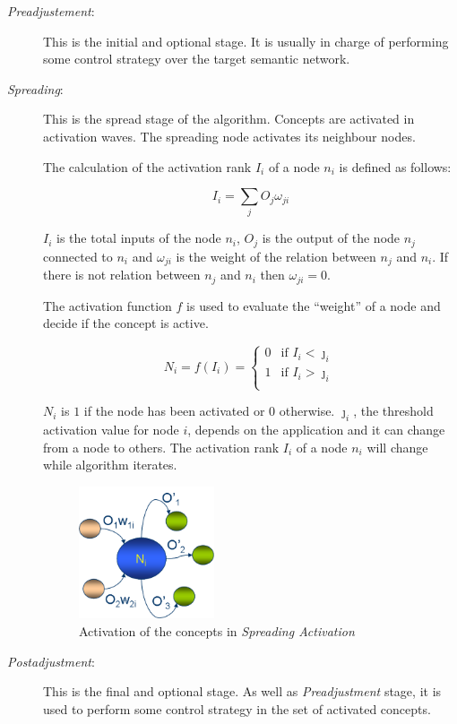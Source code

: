 \documentclass{llncs}
\begin{document}
\begin{description}
\item [\textit{Preadjustement}:] This is the initial and optional stage. It is usually in charge
of performing some control strategy over the target semantic network.
\medskip

\item [\textit{Spreading}:] This is the spread stage of the algorithm. Concepts
are activated in activation waves. The spreading node activates its neighbour
nodes.
\medskip

The calculation of the activation rank $I_i$ of a node $n_i$ is defined as
follows:

\begin{equation}
I_i  = \sum_j{O_j \omega_{ji}}
\end{equation}
\medskip

$I_i$ is the total inputs of the node $n_i$, $O_j$
is the output of the node $n_j$ connected to $n_i$ and $\omega_{ji}$
is the weight of the relation between $n_j$ and $n_i$. 
If there is not relation between $n_j$ and $n_i$ then
$\omega_{ji} = 0$. 


The activation function $f$ is used to evaluate the ``weight'' of a node and
decide if the concept is active.


\begin{equation}
N_i=f(I_i)=\begin{cases} 0 & \text{if $I_i < \jmath_i$} \\ 1 &
\text{if $I_i > \jmath_i$}
\\ \end{cases}
\end{equation}


$N_i$ is $1$ if the node has been activated or 0 otherwise. 
$\jmath_i$, the threshold activation value for node $i$, depends on the application
and it can change from a node to others. The activation rank $I_i$ of a
node $n_i$ will change while algorithm iterates.

\begin{figure}[h]
 \centering
 \includegraphics[width=4cm]{images/modelo-sa}
    \caption{Activation of the concepts in \textit{Spreading Activation}}
 \label{fig:modelo-sa}
\end{figure}

\item [\textit{Postadjustment}:] This is the final and optional stage. As well as
\textit{Preadjustment} stage, it is used to perform some control strategy in the
set of activated concepts.

\end{description}
\end{document}
